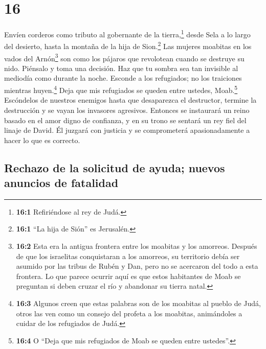 \hypertarget{section-15}{%
\section{16}\label{section-15}}

 Envíen corderos como tributo al gobernante de la
tierra,\footnote{\textbf{16:1} Refiriéndose al rey de Judá.} desde Sela
a lo largo del desierto, hasta la montaña de la hija de Sion.\footnote{\textbf{16:1}
  ``La hija de Sión'' es Jerusalén.}  Las mujeres moabitas
en los vados del Arnón\footnote{\textbf{16:2} Esta era la antigua
  frontera entre los moabitas y los amorreos. Después de que los
  israelitas conquistaran a los amorreos, su territorio debía ser
  asumido por las tribus de Rubén y Dan, pero no se acercaron del todo a
  esta frontera. Lo que parece ocurrir aquí es que estos habitantes de
  Moab se preguntan si deben cruzar el río y abandonar su tierra natal.}
son como los pájaros que revolotean cuando se destruye su nido.
 Piénsalo y toma una decisión. Haz que tu sombra sea tan
invisible al mediodía como durante la noche. Esconde a los refugiados;
no los traiciones mientras huyen.\footnote{\textbf{16:3} Algunos creen
  que estas palabras son de los moabitas al pueblo de Judá, otros las
  ven como un consejo del profeta a los moabitas, animándoles a cuidar
  de los refugiados de Judá.}  Deja que mis refugiados se
queden entre ustedes, Moab.\footnote{\textbf{16:4} O ``Deja que mis
  refugiados de Moab se queden entre ustedes''.} Escóndelos de nuestros
enemigos hasta que desaparezca el destructor, termine la destrucción y
se vayan los invasores agresivos.  Entonces se instaurará
un reino basado en el amor digno de confianza, y en su trono se sentará
un rey fiel del linaje de David. Él juzgará con justicia y se
comprometerá apasionadamente a hacer lo que es correcto.

\hypertarget{rechazo-de-la-solicitud-de-ayuda-nuevos-anuncios-de-fatalidad}{%
\subsection{Rechazo de la solicitud de ayuda; nuevos anuncios de
fatalidad}\label{rechazo-de-la-solicitud-de-ayuda-nuevos-anuncios-de-fatalidad}}

